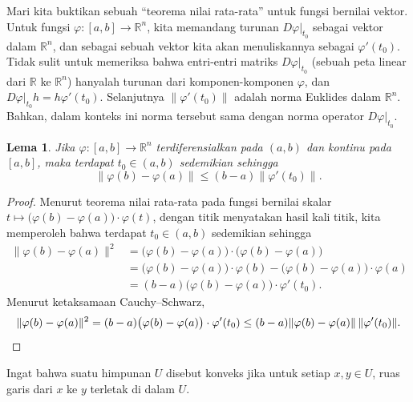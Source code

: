 \documentclass[12pt,openany]{book}
\newcommand{\snorm}[1]{\lVert {#1} \rVert}
\newcommand{\R}{{\mathbb{R}}}
\newcommand{\myquote}[1]{``#1''}
\theoremstyle{plain}
\newtheorem{lemma}[thm]{Lema}
\theoremstyle{remark}
\theoremstyle{definition}
\theoremstyle{exercise}
\theoremstyle{example}
\begin{document}
Mari kita buktikan sebuah \myquote{teorema nilai rata-rata} untuk fungsi bernilai vektor.
Untuk fungsi $\varphi \colon [a,b] \to \R^n$, kita memandang turunan
$D\varphi|_{t_0}$ sebagai vektor dalam $\R^n$, dan sebagai
sebuah vektor kita akan menuliskannya sebagai
$\varphi'(t_0)$.
Tidak sulit untuk memeriksa bahwa
entri-entri matriks $D\varphi|_{t_0}$
(sebuah peta linear dari $\R$ ke $\R^n$)
hanyalah turunan dari
komponen-komponen $\varphi$,
dan $D\varphi|_{t_0} h = h \varphi'(t_0)$.  Selanjutnya
$\snorm{\varphi'(t_0)}$
adalah norma Euklides dalam $\R^n$.  Bahkan, dalam konteks ini norma tersebut sama
dengan norma operator $D\varphi|_{t_0}$.

\begin{lemma}
Jika $\varphi \colon [a,b] \to \R^n$ terdiferensialkan pada $(a,b)$ dan
kontinu pada $[a,b]$, maka terdapat $t_0 \in (a,b)$ sedemikian sehingga
\begin{equation*}
\snorm{\varphi(b)-\varphi(a)} \leq (b-a) \snorm{\varphi'(t_0)} .
\end{equation*}
\end{lemma}

\begin{proof}
Menurut teorema nilai rata-rata pada fungsi bernilai skalar
$t \mapsto \bigl(\varphi(b)-\varphi(a) \bigr) \cdot \varphi(t)$,
dengan titik menyatakan hasil kali titik, kita memperoleh
bahwa
terdapat $t_0 \in (a,b)$ sedemikian sehingga
\begin{equation*}
\begin{split}
\snorm{\varphi(b)-\varphi(a)}^2
& =
\bigl( \varphi(b)-\varphi(a) \bigr)
\cdot
\bigl( \varphi(b)-\varphi(a) \bigr)
\\
& =
\bigl(\varphi(b)-\varphi(a) \bigr) \cdot \varphi(b) - 
\bigl(\varphi(b)-\varphi(a) \bigr) \cdot \varphi(a)
\\
& = 
(b-a)
\bigl(\varphi(b)-\varphi(a) \bigr) \cdot \varphi'(t_0) .
\end{split}
\end{equation*}
Menurut ketaksamaan Cauchy--Schwarz,
\begin{equation*}
\snorm{\varphi(b)-\varphi(a)}^2
=
(b-a)\bigl(\varphi(b)-\varphi(a) \bigr) \cdot \varphi'(t_0)
\leq
(b-a)
\snorm{\varphi(b)-\varphi(a)} \, \snorm{\varphi'(t_0)} . \qedhere
\end{equation*}
\end{proof}

Ingat bahwa suatu himpunan $U$ disebut konveks
jika untuk setiap $x,y \in U$, ruas garis dari
$x$ ke $y$ terletak di dalam $U$.
\end{document}
